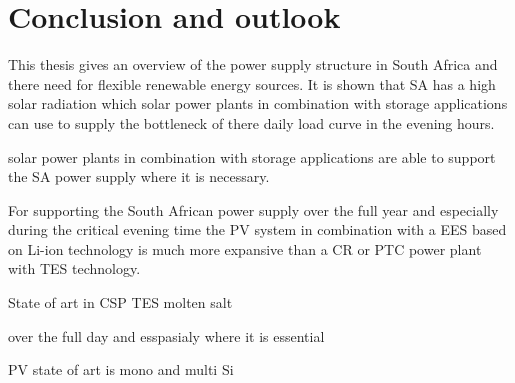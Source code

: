 \chapter{Conclusion and outlook}
This thesis gives an overview of the power supply structure in South Africa and there need for flexible renewable energy sources. It is shown that SA has a high solar radiation which solar power plants in combination with storage applications can use to supply the bottleneck of there daily load curve in the evening hours. 


solar power plants in combination with storage applications are able to support the SA power supply where it is necessary.

For supporting the South African power supply over the full year and especially during the critical evening time the PV system in combination with a EES based on Li-ion technology is much more expansive than a CR or PTC power plant with TES technology. 

State of art in CSP TES molten salt

over the full day and esspasialy where it is essential 

PV state of art is mono and multi Si 

